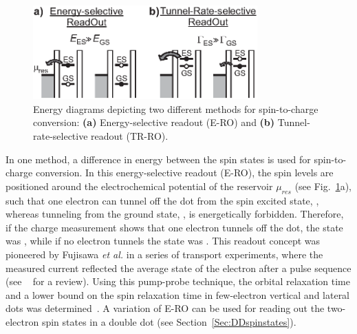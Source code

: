 \documentclass[rmp,twocolumn,aps]{revtex4}
\begin{document}
\begin{figure}[htb]
\includegraphics[width=3.4in, clip=true]{hanson_fig14.eps}
\caption{Energy diagrams depicting two different methods for
spin-to-charge conversion: \textbf{(a)} Energy-selective readout
(E-RO) and \textbf{(b)} Tunnel-rate-selective readout (TR-RO).}
\label{Fig:ROdiagrams}
\end{figure}

In one method, a difference in energy between the spin states is
used for spin-to-charge conversion. In this energy-selective
readout (E-RO), the spin levels are positioned around the
electrochemical potential of the reservoir $\mu_{res}$ (see
Fig.~\ref{Fig:ROdiagrams}a), such that one electron can tunnel off
the dot from the spin excited state, , whereas tunneling
from the ground state, , is energetically forbidden.
Therefore, if the charge measurement shows that one electron
tunnels off the dot, the state was , while if no
electron tunnels the state was . This readout concept was pioneered by Fujisawa \textit{et al.} in a series of transport experiments, where the measured current reflected the average state of the electron after a pulse sequence (see ~\textcite{FujisawaRPP2006} for a review). Using this pump-probe technique, the orbital relaxation time and a lower bound on the spin relaxation time in few-electron vertical and lateral dots was determined~\cite{FujisawaPRB2001,FujisawaPhysB2001,FujisawaNature2002,HansonPRL2003}. A variation of E-RO can be used for reading out the two-electron spin states in a double dot (see Section~\ref{Sec:DDspinstates}).
\end{document}
